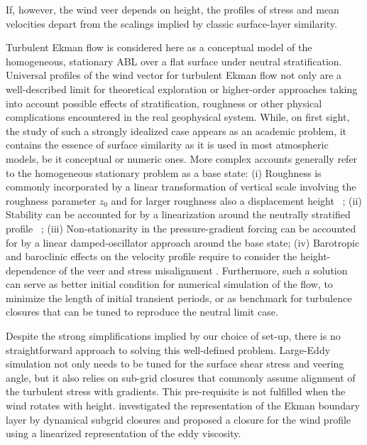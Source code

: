\documentclass[smallcondensed,final]{svjour3}
\begin{document}
%
If, however, the wind veer depends on height, the profiles of stress and mean velocities depart from the
scalings implied by classic surface-layer similarity.
%
\par
%
Turbulent Ekman flow is considered here as a conceptual model of the
homogeneous, stationary ABL over a flat surface under neutral stratification. 
%
Universal profiles of the wind vector for turbulent Ekman flow not only are a well-described limit
for theoretical exploration or higher-order approaches taking into account possible effects of stratification,
roughness or other physical complications encountered in the real geophysical system.
%
While, on first sight, the study of such a strongly idealized case appears as an academic problem, it contains the essence
of surface similarity as it is used in most atmospheric models, be it conceptual or numeric ones.
%
More complex accounts generally refer to the homogeneous stationary problem as a base state: 
%
(i) Roughness is commonly incorporated by a linear transformation of vertical scale involving the
roughness parameter $z_0$ and for larger roughness also a displacement height~%
\citep{monin:1975,jacobs:AFM1988,hogstrom:BM1988};
%
(ii) Stability can be accounted for by a linearization around the neutrally stratified profile~%
\citep{monin:ARF1970, monin:1975, hogstrom:BM1988, hogstrom:BM1996,sakagami:BM2020};
%
(iii) Non-stationarity in the pressure-gradient forcing can be accounted for by a linear damped-oscillator
approach around the base state\citep{momen:JAS2016}; 
%
(iv) Barotropic and baroclinic effects on the velocity profile require to consider 
the height-dependence of the veer and stress misalignment \citep{momen:JAS2018, ghannam:QJR2021}.
% 
Furthermore, such a solution can serve as better initial condition for numerical simulation of the flow,
to minimize the length of initial transient periods, or as benchmark for turbulence
closures that can be tuned to reproduce the neutral limit case.
%
\par
%
Despite the strong simplifications implied by our choice of set-up, there is no straightforward approach to solving
this well-defined problem.
%
Large-Eddy simulation not only needs to be tuned for the surface shear stress and veering angle, but it also
relies on sub-grid closures that commonly assume alignment of the turbulent stress with gradients.
%
This pre-requisite is not fulfilled when the wind rotates with height.
%
\citet{esau:EFM2004} investigated the representation of the Ekman boundary layer by dynamical subgrid closures
and \cite{zikanov:JFM2003} proposed a closure for the wind profile using a linearized representation of the eddy viscosity.
\end{document}
